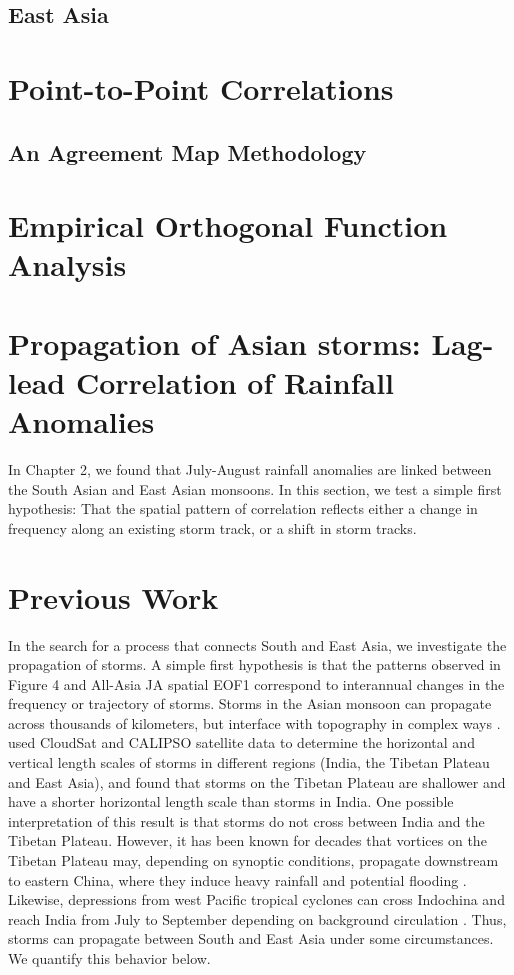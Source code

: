 \subsection{East Asia}

\section{Point-to-Point Correlations}

\subsection{An Agreement Map Methodology}

\section{Empirical Orthogonal Function Analysis}

\section{Propagation of Asian storms: Lag-lead Correlation of Rainfall Anomalies}

In Chapter 2, we found that July-August rainfall anomalies are linked between the South Asian and East Asian monsoons. In this section, we test a simple first hypothesis: That the spatial pattern of correlation reflects either a change in frequency along an existing storm track, or a shift in storm tracks.

\section{Previous Work}
	
	In the search for a process that connects South and East Asia, we investigate the propagation of storms. A simple first hypothesis is that the patterns observed in Figure 4 and All-Asia JA spatial EOF1 correspond to interannual changes in the frequency or trajectory of storms. Storms in the Asian monsoon can propagate across thousands of kilometers, but interface with topography in complex ways \parencite{Romatschke2011a}. \cite{Luo2011} used CloudSat and CALIPSO satellite data to determine the horizontal and vertical length scales of storms in different regions (India, the Tibetan Plateau and East Asia), and found that storms on the Tibetan Plateau are shallower and have a shorter horizontal length scale than storms in India. One possible interpretation of this result is that storms do not cross between India and the Tibetan Plateau. However, it has been known for decades that vortices on the Tibetan Plateau may, depending on synoptic conditions, propagate downstream to eastern China, where they induce heavy rainfall and potential flooding \parencite{Tao1981,Murakami1984,Chen1984,Yasunari2006,Xu2011,Wang2012a}. Likewise, depressions from west Pacific tropical cyclones can cross Indochina and reach India from July to September depending on background circulation \parencite{Chen1999,Fudeyasu2006}. Thus, storms can propagate between South and East Asia under some circumstances. We quantify this behavior below.
	
